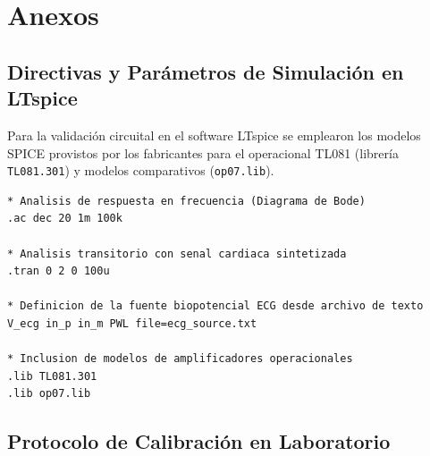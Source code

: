 \chapter{Anexos}
\label{sec:anexos}

\section{Directivas y Parámetros de Simulación en LTspice}

Para la validación circuital en el software LTspice se emplearon los modelos SPICE provistos por los fabricantes para
el operacional TL081 (librería \texttt{TL081.301}) y modelos comparativos (\texttt{op07.lib}).

\begin{lstlisting}[style=ltspice, caption={Directivas SPICE empleadas para la caracterización en frecuencia y en el dominio temporal.}]
* Analisis de respuesta en frecuencia (Diagrama de Bode)
.ac dec 20 1m 100k

* Analisis transitorio con senal cardiaca sintetizada
.tran 0 2 0 100u

* Definicion de la fuente biopotencial ECG desde archivo de texto
V_ecg in_p in_m PWL file=ecg_source.txt

* Inclusion de modelos de amplificadores operacionales
.lib TL081.301
.lib op07.lib
\end{lstlisting}

\section{Protocolo de Calibración en Laboratorio}

